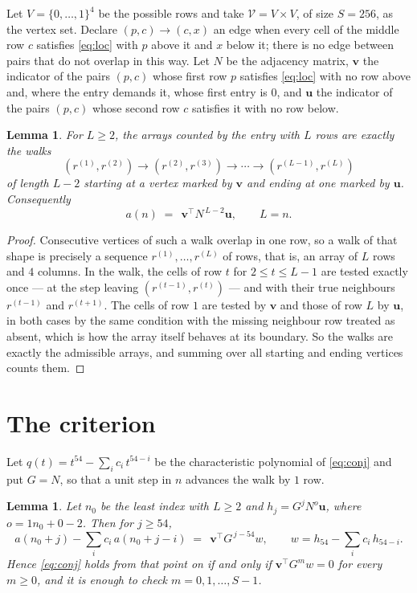 \documentclass[11pt,a4paper]{article}
\theoremstyle{plain}
\newtheorem{lemma}[theorem]{Lemma}
\theoremstyle{definition}
\begin{document}
Let $V=\{0,\dots,1\}^{4}$ be the possible rows and take
$\mathcal V=V\times V$, of size $S=256$, as the vertex set. Declare $(p,c)\to(c,x)$ an edge
when every cell of the middle row $c$ satisfies \eqref{eq:loc} with $p$ above it and $x$
below it; there is no edge between pairs that do not overlap in this way. Let $N$ be the
adjacency matrix, $\mathbf{v}$ the indicator of the pairs $(p,c)$ whose first row $p$
satisfies \eqref{eq:loc} with no row above and, where the entry demands it, whose first entry is $0$, and $\mathbf{u}$ the indicator of
the pairs $(p,c)$ whose second row $c$ satisfies it with no row below.

\begin{lemma}\label{lem:walk}
For $L\ge2$, the arrays counted by the entry with $L$ rows are exactly the walks
\[
(r^{(1)},r^{(2)})\to(r^{(2)},r^{(3)})\to\cdots\to(r^{(L-1)},r^{(L)})
\]
of length $L-2$ starting at a vertex marked by $\mathbf{v}$ and ending at one marked by
$\mathbf{u}$. Consequently
\[
a(n)\;=\;\,\mathbf{v}^{\!\top}N^{\,L-2}\mathbf{u},\qquad L=n .
\]
\end{lemma}

\begin{proof}
Consecutive vertices of such a walk overlap in one row, so a walk of that shape is
precisely a sequence $r^{(1)},\dots,r^{(L)}$ of rows, that is, an array of $L$ rows
and $4$ columns. In the walk, the cells of row $t$ for $2\le t\le L-1$ are tested
exactly once --- at the step leaving $(r^{(t-1)},r^{(t)})$ --- and with their true
neighbours $r^{(t-1)}$ and $r^{(t+1)}$. The cells of row $1$ are tested by
$\mathbf{v}$ and those of row $L$ by $\mathbf{u}$, in both cases by the same condition
with the missing neighbour row treated as absent, which is how the array itself behaves at
its boundary. So the walks are exactly the admissible arrays, and summing over all starting
and ending vertices counts them.
\end{proof}

\section{The criterion}

Let $q(t)=t^{54}-\sum_i c_i\,t^{54-i}$ be the characteristic polynomial of
\eqref{eq:conj} and put $G=N$, so that a unit step in $n$ advances the walk by
$1$ row.

\begin{lemma}\label{lem:crit}
Let $n_0$ be the least index with $L\ge2$ and $h_j=G^{j}N^{o}\mathbf{u}$, where
$o=1n_0+0-2$. Then for $j\ge54$,
\[
a(n_0+j)-\sum_i c_i\,a(n_0+j-i)\;=\;\,\mathbf{v}^{\!\top}G^{\,j-54}w,
\qquad w=h_{54}-\sum_i c_i\,h_{54-i} .
\]
Hence \eqref{eq:conj} holds from that point on if and only if
$\mathbf{v}^{\!\top}G^{m}w=0$ for every $m\ge0$, and it is enough to check
$m=0,1,\dots,S-1$.
\end{lemma}
\end{document}
